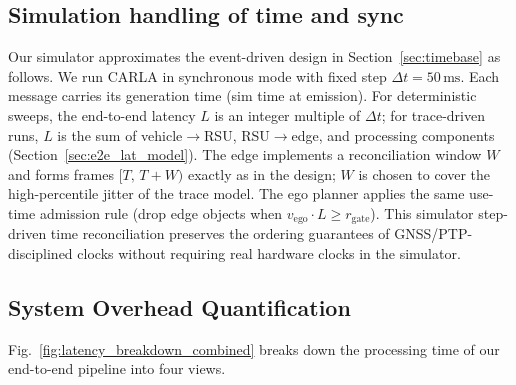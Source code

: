 \subsection{Simulation handling of time and sync}
\label{sec:mapping_sim_to_real}
Our simulator approximates the event-driven design in Section~\ref{sec:timebase} as follows. We run CARLA in synchronous mode with fixed step \(\Delta t=50\,\mathrm{ms}\). Each message carries its generation time (sim time at emission). For deterministic sweeps, the end-to-end latency \(L\) is an integer multiple of \(\Delta t\); for trace-driven runs, \(L\) is the sum of vehicle\(\to\)RSU, RSU\(\to\)edge, and processing components (Section~\ref{sec:e2e_lat_model}). The edge implements a reconciliation window \(W\) and forms frames \([T,\,T{+}W)\) exactly as in the design; \(W\) is chosen to cover the high-percentile jitter of the trace model. The ego planner applies the same use-time admission rule (drop edge objects when \(v_{\text{ego}}\!\cdot\!L \ge r_{\text{gate}}\)). This simulator step-driven time reconciliation preserves the ordering guarantees of GNSS/PTP-disciplined clocks without requiring real hardware clocks in the simulator.







%
%

%








\subsection{System Overhead Quantification}
\label{sec:eval:overhead}

Fig.~\ref{fig:latency_breakdown_combined} breaks down the processing time of our end-to-end pipeline into four views.


